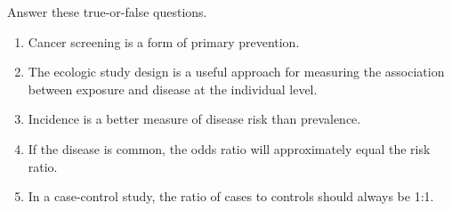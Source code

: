 Answer these true-or-false questions.
\begin{enumerate}
\item Cancer screening is a form of primary prevention. 

\item The ecologic study design is a useful approach for measuring the association between exposure and disease at the individual level.

\item Incidence is a better measure of disease risk than prevalence.

\item If the disease is common, the odds ratio will approximately equal the risk ratio.

\item In a case-control study, the ratio of cases to controls should always be 1:1.
\end{enumerate}

